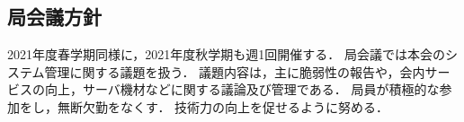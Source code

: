 \subsection*{局会議方針}

2021年度春学期同様に，2021年度秋学期も週1回開催する．
局会議では本会のシステム管理に関する議題を扱う．
議題内容は，主に脆弱性の報告や，会内サービスの向上，サーバ機材などに関する議論及び管理である．
局員が積極的な参加をし，無断欠勤をなくす．
技術力の向上を促せるように努める．
